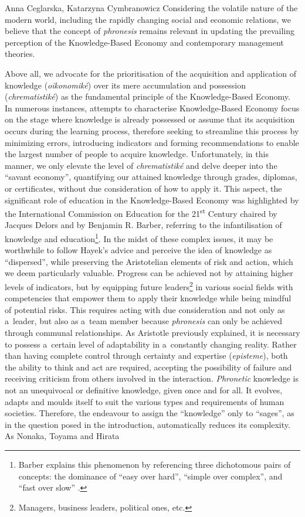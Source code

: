 \begin{artengenv2auth}{Anna Ceglarska, Katarzyna Cymbranowicz}
Considering the volatile nature of the modern world, including the rapidly changing social and economic relations, we believe that the concept of \textit{phronesis} remains relevant in updating the prevailing perception of the Knowledge-Based Economy and contemporary management theories.



Above all, we advocate for the prioritisation of the acquisition and application of knowledge (\textit{oikonomiké}) over its mere accumulation and possession (\textit{chrematistiké}) as the fundamental principle of the Knowledge-Based Economy. In numerous instances, attempts to characterise Knowledge-Based Economy focus on the stage where knowledge is already possessed or assume that its acquisition occurs during the learning process, therefore seeking to streamline this process by minimizing errors, introducing indicators and forming recommendations to enable the largest number of people to acquire knowledge. Unfortunately, in this manner, we only elevate the level of \textit{chrematistiké} and delve deeper into the ``savant economy'', quantifying our attained knowledge through grades, diplomas, or certificates, without due consideration of how to apply it. This aspect, the significant role of education in the Knowledge-Based Economy was highlighted by the International Commission on Education for the 21\textsuperscript{st} Century chaired by Jacques Delors and by Benjamin R. Barber, referring to the infantilisation of knowledge and education\footnote{Barber explains this phenomenon by referencing three dichotomous pairs of concepts: the dominance of ``easy over hard'', ``simple over complex'', and ``fast over slow'' 
\parencite[][pp.85–107]{barber_consumed_2008}.%
}. In the midst of these complex issues, it may be worthwhile to follow Hayek's advice and perceive the idea of knowledge as ``dispersed'', while preserving the Aristotelian elements of risk and action, which we deem particularly valuable. Progress can be achieved not by attaining higher levels of indicators, but by equipping future leaders\footnote{Managers, business leaders, political ones, etc.} in various social fields with competencies that empower them to apply their knowledge while being mindful of potential risks. This requires acting with due consideration and not only as a~leader, but also as a~team member because \textit{phronesis} can only be achieved through communal relationships. As Aristotle previously explained, it is necessary to possess a~certain level of adaptability in a~constantly changing reality. Rather than having complete control through certainty and expertise (\textit{episteme}), both the ability to think and act are required, accepting the possibility of failure and receiving criticism from others involved in the interaction. \textit{Phronetic} knowledge is not an unequivocal or definitive knowledge, given once and for all. It evolves, adapts and moulds itself to suit the various types and requirements of human societies. Therefore, the endeavour to assign the ``knowledge'' only to ``sages'', as in the question posed in the introduction, automatically reduces its complexity. As Nonaka, Toyama and Hirata 

\end{artengenv2auth}
